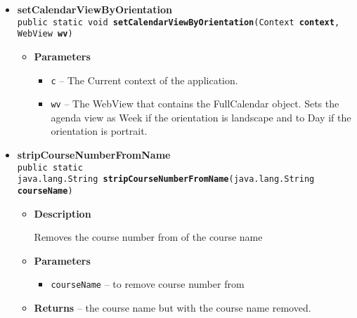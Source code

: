 \documentclass[11pt,a4paper]{report}
\begin{document}
{{{\begin{itemize}
{\begin{itemize}
{}%
\item{{\bf  Returns} -- 
True IFF cal1 and cal2 are the same day. 
}%
\end{itemize}
}%
\item{ 
{\bf  setCalendarViewByOrientation}\\
\texttt{public static void\ {\bf  setCalendarViewByOrientation}(\texttt{Context} {\bf  context},
\texttt{WebView} {\bf  wv})
\label{is.mpg.ruglan.utils.Utils.setCalendarViewByOrientation(Context, WebView)}}%
\begin{itemize}
\item{
{\bf  Parameters}
  \begin{itemize}
   \item{
\texttt{c} -- The Current context of the application.}
   \item{
\texttt{wv} -- The WebView that contains the FullCalendar object. Sets the agenda view as Week if the orientation is landscape and to Day if the orientation is portrait.}
  \end{itemize}
}%
\end{itemize}
}%
\item{ 
{\bf  stripCourseNumberFromName}\\
\texttt{public static java.lang.String\ {\bf  stripCourseNumberFromName}(\texttt{java.lang.String} {\bf  courseName})
\label{is.mpg.ruglan.utils.Utils.stripCourseNumberFromName(java.lang.String)}}%
\begin{itemize}
\item{
{\bf  Description}

Removes the course number from of the course name
}
\item{
{\bf  Parameters}
  \begin{itemize}
   \item{
\texttt{courseName} -- to remove course number from}
  \end{itemize}
}%
\item{{\bf  Returns} -- 
the course name but with the course name removed. 
}%
\end{itemize}
}%
\end{itemize}
}
}
}
\end{document}
